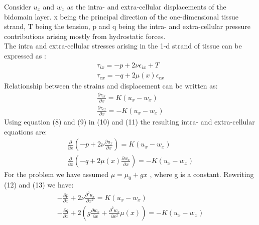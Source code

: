 \documentclass[a4paper,oneside,11pt]{report}
\begin{document}
Consider $u_{x}$ and $w_{x}$ as the intra- and extra-cellular displacements of the bidomain layer. x being the principal direction of the one-dimensional tissue strand, T being the tension, p and q being the intra- and extra-cellular pressure contributions arising mostly from hydrostatic forces. \\

The intra and extra-cellular stresses arising in the 1-d strand of tissue can be expressed as \cite{roth2015}: 
\begin{align}
\tau_{ix} = -p + 2\nu\epsilon_{ix} + T \\
\tau_{ex} = -q + 2\mu(x)\epsilon_{ex}   
\end{align}
Relationship between the strains and displacement can be written as: 
\begin{align}
\frac{\partial\tau_{ix}}{\partial x} = K (u_x - w_x) \\
\frac{\partial\tau_{ex}}{\partial x} = - K (u_x - w_x) 
\end{align}
Using equation (8) and (9) in (10) and (11) the resulting intra- and extra-cellular equations are: 
\begin{align}
\frac{\partial}{\partial x}(-p + 2\nu\frac{\partial u_x}{\partial x}) = K (u_x - w_x) \\
\frac{\partial}{\partial x}(-q + 2\mu (x) \frac{\partial w_x}{\partial x}) = -K (u_x - w_x)
\end{align}
For the problem we have assumed $\mu = \mu_0 + gx$ , where g is a constant. Rewriting (12) and (13) we have:
\begin{align}
- \frac{\partial p}{\partial x} + 2\nu\frac{\partial^{2}u_x}{\partial x^2} = K (u_x - w_x) \\
- \frac{\partial q}{\partial x} + 2(g\frac{\partial w_x}{\partial x} + \frac{\partial^{2}w_x}{\partial x^2} \mu(x)) = -K(u_x - w_x)
\end{align}
\clearpage
\end{document}
